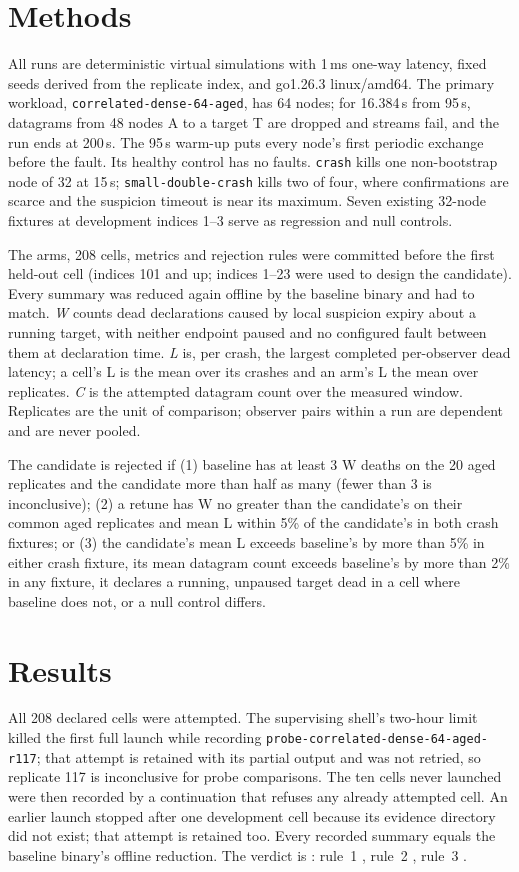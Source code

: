 \documentclass[10pt]{article}
\begin{document}
\section{Methods}
All runs are deterministic virtual simulations with 1\,ms one-way latency,
fixed seeds derived from the replicate index, and go1.26.3 linux/amd64.
The primary workload, \texttt{correlated-dense-64-aged}, has 64 nodes; for
16.384\,s from 95\,s, datagrams from 48 nodes A to a target T are dropped
and streams fail, and the run ends at 200\,s. The 95\,s warm-up puts every
node's first periodic exchange before the fault. Its healthy control has
no faults. \texttt{crash} kills one non-bootstrap node of 32 at 15\,s;
\texttt{small-double-crash} kills two of four, where confirmations are
scarce and the suspicion timeout is near its maximum. Seven existing
32-node fixtures at development indices 1--3 serve as regression and null
controls.

The arms, 208 cells, metrics and rejection rules were committed before the
first held-out cell (indices 101 and up; indices 1--23 were used to design
the candidate). Every summary was reduced again offline by the baseline
binary and had to match. \emph{W} counts dead declarations caused by local
suspicion expiry about a running target, with neither endpoint paused and
no configured fault between them at declaration time. \emph{L} is, per
crash, the largest completed per-observer dead latency; a cell's L is the
mean over its crashes and an arm's L the mean over replicates. \emph{C} is
the attempted datagram count over the measured window. Replicates are the
unit of comparison; observer pairs within a run are dependent and are
never pooled.

The candidate is rejected if (1) baseline has at least 3 W deaths on the
20 aged replicates and the candidate more than half as many (fewer than 3
is inconclusive); (2) a retune has W no greater than the candidate's on
their common aged replicates and mean L within 5\% of the candidate's in
both crash fixtures; or (3) the candidate's mean L exceeds baseline's by
more than 5\% in either crash fixture, its mean datagram count exceeds
baseline's by more than 2\% in any fixture, it declares a running,
unpaused target dead in a cell where baseline does not, or a null control
differs.

\section{Results}
All 208 declared cells were attempted. The supervising shell's two-hour
limit killed the first full launch while recording
\texttt{probe-correlated-dense-64-aged-r117}; that attempt is retained
with its partial output and was not retried, so replicate 117 is
inconclusive for probe comparisons. The ten cells never launched were then
recorded by a continuation that refuses any already attempted cell. An
earlier launch stopped after one development cell because its evidence
directory did not exist; that attempt is retained too. Every recorded
summary equals the baseline binary's offline reduction. The verdict is
\emph{\Verdict}: rule~1 \RuleOne, rule~2 \RuleTwo, rule~3 \RuleThree.
\end{document}
